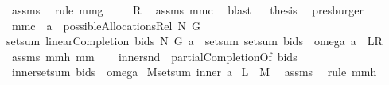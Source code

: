 \begin{isabellebody}
\ assms\ \isamarkupfalse%
\ {\isacharparenleft}rule\ mm{}{}g{\isacharparenright}\isanewline
{}\isamarkupfalse%
\ \isamarkupfalse%
\ {\isachardoublequoteopen}{\isachardot}{\isachardot}{\isachardot}\ {\isacharequal}\ {\isacharquery}R{\isachardoublequoteclose}\ \isamarkupfalse%
\ assms\ mm{}{}c\ \isamarkupfalse%
\ blast\isanewline
{}\isamarkupfalse%
\ \isamarkupfalse%
\ {\isacharquery}thesis\ \isamarkupfalse%
\ presburger\isanewline
{}\isamarkupfalse%
%
\endisatagproof
{\isafoldproof}%
%
\isadelimproof
\isanewline
%
\endisadelimproof
{}\isamarkupfalse%
\ mm{}{}c{\isacharcolon}\ \ {\isachardoublequoteopen}a\ {\isasymin}\ possibleAllocationsRel\ N\ G{\isachardoublequoteclose}\ \ \isanewline
{\isachardoublequoteopen}setsum\ {\isacharparenleft}linearCompletion{\isacharprime}\ bids\ N\ G{\isacharparenright}\ a\ {\isacharequal}\ setsum\ {\isacharparenleft}{\isacharparenleft}setsum\ bids{\isacharparenright}\ {\isasymcirc}\ omega{\isacharparenright}\ a{\isachardoublequoteclose}\ {\isacharparenleft}\ {\isachardoublequoteopen}{\isacharquery}L{\isacharequal}{\isacharquery}R{\isachardoublequoteclose}{\isacharparenright}\ \isanewline
%
\isadelimproof
%
\endisadelimproof
%
\isatagproof
{}\isamarkupfalse%
\ assms\ mm{}{}h\ mm{}{}\ \isanewline
{}\isamarkupfalse%
\ {\isacharminus}\isanewline
{}\isamarkupfalse%
\ {\isacharquery}inner{}{\isacharequal}{\isachardoublequoteopen}snd\ {\isasymcirc}\ {\isacharparenleft}partialCompletionOf\ bids{\isacharparenright}{\isachardoublequoteclose}\ \isamarkupfalse%
\ {\isacharquery}inner{}{\isacharequal}{\isachardoublequoteopen}{\isacharparenleft}setsum\ bids{\isacharparenright}\ {\isasymcirc}\ omega{\isachardoublequoteclose}\isanewline
{}\isamarkupfalse%
\ {\isacharquery}M{\isacharequal}{\isachardoublequoteopen}setsum\ {\isacharquery}inner{}\ a{\isachardoublequoteclose}\isanewline
{}\isamarkupfalse%
\ {\isachardoublequoteopen}{\isacharquery}L\ {\isacharequal}\ {\isacharquery}M{\isachardoublequoteclose}\ \isamarkupfalse%
\ assms\ \isamarkupfalse%
\ {\isacharparenleft}rule\ mm{}{}h{\isacharparenright}\isanewline
{}\isamarkupfalse%

\end{isabellebody}
